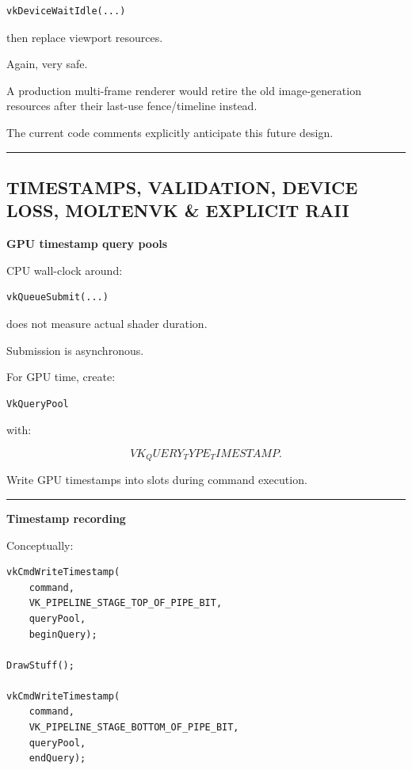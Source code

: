 \begin{verbatim}
vkDeviceWaitIdle(...)
\end{verbatim}

then replace viewport resources.

Again, very safe.

A production multi-frame renderer would retire the old image-generation resources after their last-use fence/timeline instead.

The current code comments explicitly anticipate this future design.

\begin{center}\rule{0.5\linewidth}{0.5pt}\end{center}

\subsection{TIMESTAMPS, VALIDATION, DEVICE LOSS, MOLTENVK \& EXPLICIT RAII}\label{01-foundations-i-ch014-timestamps-validation-device-loss-moltenvk-explicit-raii}

\hypertarget{01-foundations-i-ch014-timestamps-validation-device-loss-moltenvk-explicit-raii}{}

\textbf{GPU timestamp query pools}

CPU wall-clock around:

\begin{verbatim}
vkQueueSubmit(...)
\end{verbatim}

does not measure actual shader duration.

Submission is asynchronous.

For GPU time, create:

\begin{verbatim}
VkQueryPool
\end{verbatim}

with:

\[
VK_QUERY_TYPE_TIMESTAMP.
\]

Write GPU timestamps into slots during command execution.

\begin{center}\rule{0.5\linewidth}{0.5pt}\end{center}

\textbf{Timestamp recording}

Conceptually:

\begin{verbatim}
vkCmdWriteTimestamp(
    command,
    VK_PIPELINE_STAGE_TOP_OF_PIPE_BIT,
    queryPool,
    beginQuery);

DrawStuff();

vkCmdWriteTimestamp(
    command,
    VK_PIPELINE_STAGE_BOTTOM_OF_PIPE_BIT,
    queryPool,
    endQuery);
\end{verbatim}

